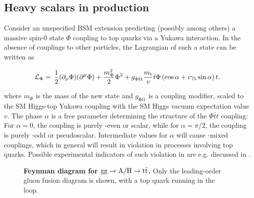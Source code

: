 \subsection{Heavy scalars in \ttbartitle production}
\label{sec:theory:ah}

Consider an unspecified BSM extension predicting (possibly among others) a massive spin-0 state $\Phi$ coupling to top quarks via a Yukawa interaction. In the absence of couplings to other particles, the Lagrangian of such a state can be written as~\cite{Maltoni:2024tul}

\begin{equation}
\label{eq:theory:lag_ah}
    \mathcal{L}_{\Phi} = \, \frac{1}{2} (\partial_\mu \Phi ) (\partial^\mu \Phi ) +\frac{m_{\Phi}^2}{2} \Phi^2 
    + g_{\mathrm{\Phi \bar{t} t}} \frac{m_{\mathrm{t}}}{v} \bar{t} \Phi \left( \cos{\alpha} + i \gamma_5 \sin{\alpha} \right) t .
\end{equation}

\noindent where $m_\Phi$ is the mass of the new state and $g_{\mathrm{\Phi \bar{t} t}}$ is a coupling modifier, scaled to the SM Higgs-top Yukawa coupling with the SM Higgs vacuum expectation value $v$. The phase $\alpha$ is a free parameter determining the \CP structure of the $\Phi \bar{t} t$ coupling: For $\alpha = 0$, the coupling is purely \CP-even or scalar, while for $\alpha = \pi/2$, the coupling is purely \CP-odd or pseudoscalar. Intermediate values for $\alpha$ will cause \CP-mixed couplings, which in general will result in  \CP violation in processes involving top quarks. Possible experimental indicators of such \CP violation in \pptt are e.g. discussed in .

\begin{figure}[!t]
    \centering
    \caption{\textbf{Feynman diagram for $\mathrm{gg \rightarrow A/H \rightarrow \mathrm{t \bar{t}}}$.} Only the leading-order gluon fusion diagram is shown, with a top quark running in the loop.}
    \label{fig:theory:ggAH}
\end{figure}

